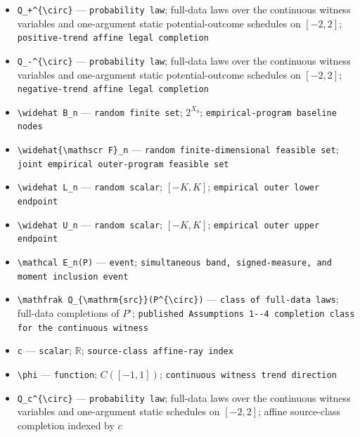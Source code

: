 \documentclass{article}
\begin{document}
\begin{itemize}
  \item \texttt{Q\_\allowbreak{}+\allowbreak{}\textasciicircum{}\{\textbackslash{}\allowbreak{}circ\}\allowbreak{}} --- \texttt{probability law}; full-data laws over the continuous witness variables and one-argument static potential-outcome schedules on \([-2,2]\); \texttt{positive-\allowbreak{}trend affine legal completion}
  \item \texttt{Q\_\allowbreak{}-\allowbreak{}\textasciicircum{}\{\textbackslash{}\allowbreak{}circ\}\allowbreak{}} --- \texttt{probability law}; full-data laws over the continuous witness variables and one-argument static potential-outcome schedules on \([-2,2]\); \texttt{negative-\allowbreak{}trend affine legal completion}
  \item \texttt{\textbackslash{}\allowbreak{}widehat B\_\allowbreak{}n} --- \texttt{random finite set}; \(2^{X_0}\); \texttt{empirical-\allowbreak{}program baseline nodes}
  \item \texttt{\textbackslash{}\allowbreak{}widehat\{\textbackslash{}\allowbreak{}mathscr F\}\allowbreak{}\_\allowbreak{}n} --- \texttt{random finite-\allowbreak{}dimensional feasible set}; \texttt{joint empirical outer-\allowbreak{}program feasible set}
  \item \texttt{\textbackslash{}\allowbreak{}widehat L\_\allowbreak{}n} --- \texttt{random scalar}; \([-K,K]\); \texttt{empirical outer lower endpoint}
  \item \texttt{\textbackslash{}\allowbreak{}widehat U\_\allowbreak{}n} --- \texttt{random scalar}; \([-K,K]\); \texttt{empirical outer upper endpoint}
  \item \texttt{\textbackslash{}\allowbreak{}mathcal E\_\allowbreak{}n(P)} --- \texttt{event}; \texttt{simultaneous band,\allowbreak{} signed-\allowbreak{}measure,\allowbreak{} and moment inclusion event}
  \item \texttt{\textbackslash{}\allowbreak{}mathfrak Q\_\allowbreak{}\{\textbackslash{}\allowbreak{}mathrm\{src\}\allowbreak{}\}\allowbreak{}(P\textasciicircum{}\{\textbackslash{}\allowbreak{}circ\}\allowbreak{})} --- \texttt{class of full-\allowbreak{}data laws}; full-data completions of \(P^{\circ}\); \texttt{published Assumptions 1-\allowbreak{}-\allowbreak{}4 completion class for the continuous witness}
  \item \texttt{c} --- \texttt{scalar}; \(\mathbb R\); \texttt{source-\allowbreak{}class affine-\allowbreak{}ray index}
  \item \texttt{\textbackslash{}\allowbreak{}phi} --- \texttt{function}; \(C([-1,1])\); \texttt{continuous witness trend direction}
  \item \texttt{Q\_\allowbreak{}c\textasciicircum{}\{\textbackslash{}\allowbreak{}circ\}\allowbreak{}} --- \texttt{probability law}; full-data laws over the continuous witness variables and one-argument static schedules on \([-2,2]\); affine source-class completion indexed by \(c\)
\end{itemize}
\end{document}
